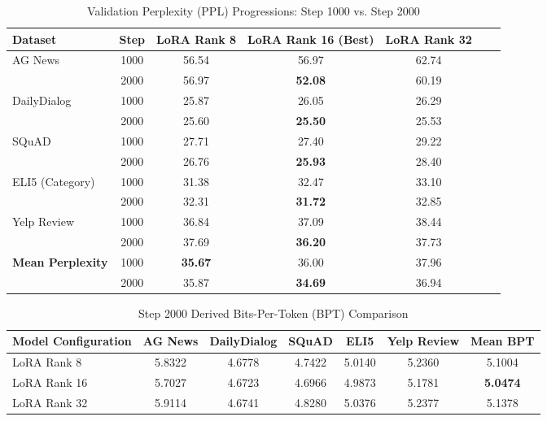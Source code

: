 \documentclass[11pt,a4paper]{article}
\begin{document}
\begin{table}[h]
\centering
\setlength{\tabcolsep}{5pt}
\caption{Validation Perplexity (PPL) Progressions: Step 1000 vs. Step 2000}
\label{tab:perplexity_results}
\begin{tabular}{lcccccc}
\toprule
Dataset & Step & LoRA Rank 8 & LoRA Rank 16 (Best) & LoRA Rank 32 \\
\midrule
AG News                    & 1000 & 56.54 & 56.97 & 62.74 \\
                           & 2000 & 56.97 & \textbf{52.08} & 60.19 \\ \midrule
DailyDialog                & 1000 & 25.87 & 26.05 & 26.29 \\
                           & 2000 & 25.60 & \textbf{25.50} & 25.53 \\ \midrule
SQuAD                      & 1000 & 27.71 & 27.40 & 29.22 \\
                           & 2000 & 26.76 & \textbf{25.93} & 28.40 \\ \midrule
ELI5 (Category)            & 1000 & 31.38 & 32.47 & 33.10 \\
                           & 2000 & 32.31 & \textbf{31.72} & 32.85 \\ \midrule
Yelp Review                & 1000 & 36.84 & 37.09 & 38.44 \\
                           & 2000 & 37.69 & \textbf{36.20} & 37.73 \\ \midrule
\textbf{Mean Perplexity}   & 1000 & \textbf{35.67} & 36.00 & 37.96 \\
                           & 2000 & 35.87 & \textbf{34.69} & 36.94 \\
\bottomrule
\end{tabular}
\end{table}

\begin{table}[h]
\centering
\setlength{\tabcolsep}{4.5pt}
\caption{Step 2000 Derived Bits-Per-Token (BPT) Comparison}
\label{tab:bpt_results}
\begin{tabular}{lcccccc}
\toprule
Model Configuration & AG News & DailyDialog & SQuAD & ELI5 & Yelp Review & \textbf{Mean BPT} \\
\midrule
LoRA Rank 8  & 5.8322 & 4.6778 & 4.7422 & 5.0140 & 5.2360 & 5.1004 \\
LoRA Rank 16 & 5.7027 & 4.6723 & 4.6966 & 4.9873 & 5.1781 & \textbf{5.0474} \\
LoRA Rank 32 & 5.9114 & 4.6741 & 4.8280 & 5.0376 & 5.2377 & 5.1378 \\
\bottomrule
\end{tabular}
\end{table}
\end{document}
